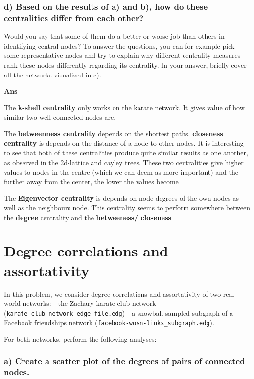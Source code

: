 \documentclass[11pt]{article}
\begin{document}
    \subsubsection{d) Based on the results of a) and b), how do these
centralities differ from each
other?}\label{d-based-on-the-results-of-a-and-b-how-do-these-centralities-differ-from-each-other}

Would you say that some of them do a better or worse job than others in
identifying central nodes? To answer the questions, you can for example
pick some representative nodes and try to explain why different
centrality measures rank these nodes differently regarding its
centrality. In your answer, briefly cover all the networks visualized in
c).

\textbf{Ans}

The \textbf{k-shell centrality} only works on the karate network. It
gives value of how similar two well-connected nodes are.

The \textbf{betweenness centrality} depends on the shortest paths.
\textbf{closeness centrality} is depends on the distance of a node to
other nodes. It is interesting to see that both of these centralities
produce quite similar results as one another, as observed in the
2d-lattice and cayley trees. These two centralities give higher values
to nodes in the centre (which we can deem as more important) and the
further away from the center, the lower the values become

The \textbf{Eigenvector centrality} is depends on node degrees of the
own nodes as well as the neighbours node. This centrality seems to
perform somewhere between the \textbf{degree} centrality and the
\textbf{betweeness/ closeness}

    \section{Degree correlations and
assortativity}\label{degree-correlations-and-assortativity}

In this problem, we consider degree correlations and assortativity of
two real-world networks: - the Zachary karate club network
(\texttt{karate\_club\_network\_edge\_file.edg}) - a snowball-sampled
subgraph of a Facebook friendships network
(\texttt{facebook-wosn-links\_subgraph.edg}).

For both networks, perform the following analyses:

\subsubsection{a) Create a scatter plot of the degrees of pairs of
connected
nodes.}\label{a-create-a-scatter-plot-of-the-degrees-of-pairs-of-connected-nodes.}
\end{document}
